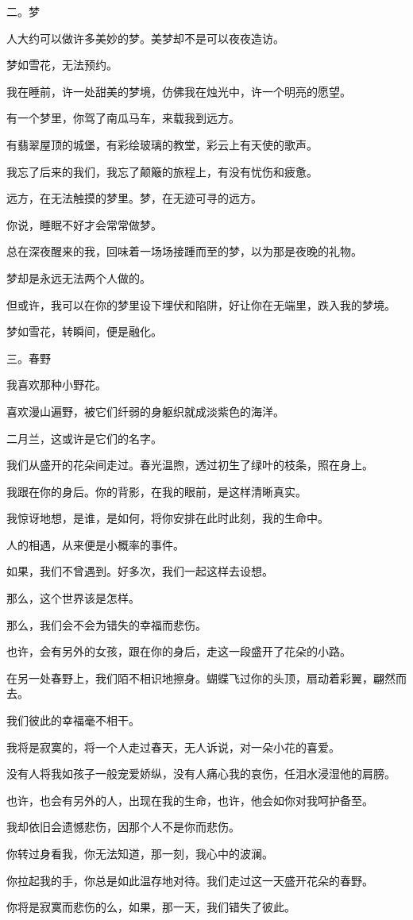 \documentclass[12pt,a4paper]{article}
\newcommand{\subpart}[1]{
	\begingroup \par
	\vspace{1ex} \centering #1
	\par \endgroup
}
\begin{document}
		\subpart{二。梦}

		人大约可以做许多美妙的梦。美梦却不是可以夜夜造访。\par
		梦如雪花，无法预约。\par
		我在睡前，许一处甜美的梦境，仿佛我在烛光中，许一个明亮的愿望。\par
		有一个梦里，你驾了南瓜马车，来载我到远方。\par
		有翡翠屋顶的城堡，有彩绘玻璃的教堂，彩云上有天使的歌声。\par
		我忘了后来的我们，我忘了颠簸的旅程上，有没有忧伤和疲惫。\par
		远方，在无法触摸的梦里。梦，在无迹可寻的远方。\par
		你说，睡眠不好才会常常做梦。\par
		总在深夜醒来的我，回味着一场场接踵而至的梦，以为那是夜晚的礼物。\par
		梦却是永远无法两个人做的。\par
		但或许，我可以在你的梦里设下埋伏和陷阱，好让你在无端里，跌入我的梦境。\par
		梦如雪花，转瞬间，便是融化。

		\subpart{三。春野}

		我喜欢那种小野花。\par
		喜欢漫山遍野，被它们纤弱的身躯织就成淡紫色的海洋。\par
		二月兰，这或许是它们的名字。\par
		我们从盛开的花朵间走过。春光温煦，透过初生了绿叶的枝条，照在身上。\par
		我跟在你的身后。你的背影，在我的眼前，是这样清晰真实。\par
		我惊讶地想，是谁，是如何，将你安排在此时此刻，我的生命中。\par
		人的相遇，从来便是小概率的事件。\par
		如果，我们不曾遇到。好多次，我们一起这样去设想。\par
		那么，这个世界该是怎样。\par
		那么，我们会不会为错失的幸福而悲伤。\par
		也许，会有另外的女孩，跟在你的身后，走这一段盛开了花朵的小路。\par
		在另一处春野上，我们陌不相识地擦身。蝴蝶飞过你的头顶，扇动着彩翼，翩然而去。\par
		我们彼此的幸福毫不相干。\par
		我将是寂寞的，将一个人走过春天，无人诉说，对一朵小花的喜爱。\par
		没有人将我如孩子一般宠爱娇纵，没有人痛心我的哀伤，任泪水浸湿他的肩膀。\par
		也许，也会有另外的人，出现在我的生命，也许，他会如你对我呵护备至。\par
		我却依旧会遗憾悲伤，因那个人不是你而悲伤。\par
		你转过身看我，你无法知道，那一刻，我心中的波澜。\par
		你拉起我的手，你总是如此温存地对待。我们走过这一天盛开花朵的春野。\par
		你将是寂寞而悲伤的么，如果，那一天，我们错失了彼此。
\end{document}
